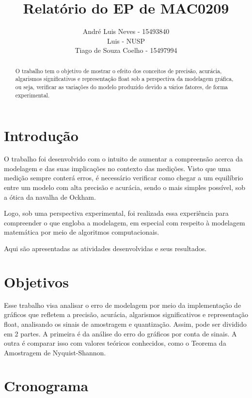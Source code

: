 \documentclass[12pt]{article}
\title{Relatório do EP de MAC0209}
\author{André Luis Neves - 15493840\\Luis - NUSP\\Tiago de Souza Coelho - 15497994}
\begin{document}
\maketitle


\begin{abstract}
O trabalho  tem o objetivo de mostrar o efeito dos conceitos de precisão, acurácia, algarismos significativos e representação float sob a perspectiva da modelagem gráfica, ou seja, verificar as variações do modelo produzido devido a vários fatores, de forma experimental. 

\end{abstract}

\newpage

\tableofcontents

\newpage

\section{Introdução}

O trabalho foi desenvolvido com o intuito de aumentar a compreensão acerca da modelagem e das suas implicações no contexto das medições. Visto que uma medição sempre conterá erros, é necessário verificar como chegar a um equilíbrio entre um modelo com alta precisão e acurácia, sendo o mais simples possível, sob a ótica da navalha de Ockham.

Logo, sob uma perspectiva experimental, foi realizada essa experiência para compreender o que engloba a modelagem, em especial com respeito à modelagem matemática por meio de algoritmos computacionais.

Aqui são apresentadas as atividades desenvolvidas e seus resultados.

\section{Objetivos}

Esse trabalho visa analisar o erro de modelagem por meio da implementação de gráficos que refletem a precisão, acurácia, algarismos significativos e representação float, analisando os sinais de amostragem e quantização. Assim, pode ser dividido em 2 partes. A primeira é da análise do erro do gráficos por conta de sinais. A outra é comparar isso com valores teóricos conhecidos, como o Teorema da Amostragem de Nyquist-Shannon.

\section{Cronograma}
\end{document}
